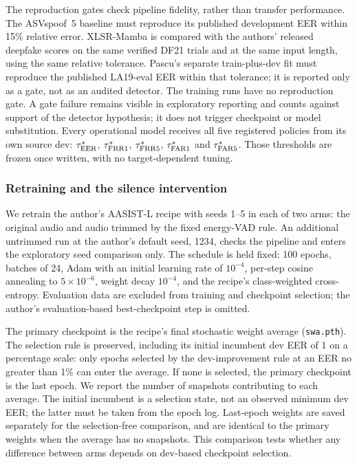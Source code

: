 The reproduction gates check pipeline fidelity, rather than transfer performance. The ASVspoof~5
baseline must reproduce its published development EER within 15\% relative error. XLSR-Mamba is
compared with the authors' released deepfake scores on the same verified DF21 trials and at the same
input length, using the same relative tolerance. Pascu's separate train-plus-dev fit must reproduce
the published LA19-eval EER within that tolerance; it is reported only as a gate, not as an audited
detector. The training runs have no reproduction gate. A gate failure remains visible in exploratory
reporting and counts against support of the detector hypothesis; it does not trigger checkpoint or
model substitution. Every operational model receives all five registered policies from its own source
dev: \(\tau^{*}_{\mathrm{EER}}\), \(\tau^{*}_{\mathrm{FRR}1}\), \(\tau^{*}_{\mathrm{FRR}5}\), \(\tau^{*}_{\mathrm{FAR}1}\) and \(\tau^{*}_{\mathrm{FAR}5}\). Those thresholds are frozen
once written, with no target-dependent tuning.

\subsubsection{Retraining and the silence intervention}
We retrain the author's AASIST-L recipe \citep{jung22_aasist} with seeds 1--5 in each of two arms:
the original audio and audio trimmed by the fixed energy-VAD rule. An additional untrimmed run at the
author's default seed, 1234, checks the pipeline and enters the exploratory seed comparison only.
The schedule is held fixed: 100 epochs, batches of 24, Adam with an initial learning rate of
\(10^{-4}\), per-step cosine annealing to \(5\times10^{-6}\), weight decay \(10^{-4}\), and the recipe's
class-weighted cross-entropy. Evaluation data are excluded from training and checkpoint selection;
the author's evaluation-based best-checkpoint step is omitted.

The primary checkpoint is the recipe's final stochastic weight average (\texttt{swa.pth}). The
selection rule is preserved, including its initial incumbent dev EER of 1 on a percentage scale:
only epochs selected by the dev-improvement rule at an EER no greater than 1\% can enter the average.
If none is selected, the primary checkpoint is the last epoch. We report the number of snapshots
contributing to each average. The initial incumbent is a selection state, not an observed minimum
dev EER; the latter must be taken from the epoch log. Last-epoch weights are saved separately for
the selection-free comparison, and are identical to the primary weights when the average has no
snapshots. This comparison tests whether any difference between arms depends on dev-based
checkpoint selection.


